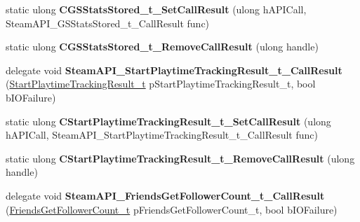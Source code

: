 \begin{DoxyCompactItemize}
static ulong {\bfseries C\+G\+S\+Stats\+Stored\+\_\+t\+\_\+\+Set\+Call\+Result} (ulong h\+A\+P\+I\+Call, Steam\+A\+P\+I\+\_\+\+G\+S\+Stats\+Stored\+\_\+t\+\_\+\+Call\+Result func)
\item 
\mbox{\label{class_valve_1_1_interop_1_1_native_entrypoints_a03a7f11078e5bb086f56d3f08d6b27b3}} 
static ulong {\bfseries C\+G\+S\+Stats\+Stored\+\_\+t\+\_\+\+Remove\+Call\+Result} (ulong handle)
\item 
\mbox{\label{class_valve_1_1_interop_1_1_native_entrypoints_a3dc12766ed22d61e6757cd411f133a44}} 
delegate void {\bfseries Steam\+A\+P\+I\+\_\+\+Start\+Playtime\+Tracking\+Result\+\_\+t\+\_\+\+Call\+Result} (\hyperlink{struct_valve_1_1_steamworks_1_1_start_playtime_tracking_result__t}{Start\+Playtime\+Tracking\+Result\+\_\+t} p\+Start\+Playtime\+Tracking\+Result\+\_\+t, bool b\+I\+O\+Failure)
\item 
\mbox{\label{class_valve_1_1_interop_1_1_native_entrypoints_a19cb50eb57c782f2ad1c85c0666c869b}} 
static ulong {\bfseries C\+Start\+Playtime\+Tracking\+Result\+\_\+t\+\_\+\+Set\+Call\+Result} (ulong h\+A\+P\+I\+Call, Steam\+A\+P\+I\+\_\+\+Start\+Playtime\+Tracking\+Result\+\_\+t\+\_\+\+Call\+Result func)
\item 
\mbox{\label{class_valve_1_1_interop_1_1_native_entrypoints_a192d34c245c77304337e9cbb4312c348}} 
static ulong {\bfseries C\+Start\+Playtime\+Tracking\+Result\+\_\+t\+\_\+\+Remove\+Call\+Result} (ulong handle)
\item 
\mbox{\label{class_valve_1_1_interop_1_1_native_entrypoints_af31551301967d5ad1e00e24cec610d79}} 
delegate void {\bfseries Steam\+A\+P\+I\+\_\+\+Friends\+Get\+Follower\+Count\+\_\+t\+\_\+\+Call\+Result} (\hyperlink{struct_valve_1_1_steamworks_1_1_friends_get_follower_count__t}{Friends\+Get\+Follower\+Count\+\_\+t} p\+Friends\+Get\+Follower\+Count\+\_\+t, bool b\+I\+O\+Failure)
\item 
\mbox{\label{class_valve_1_1_interop_1_1_native_entrypoints_ad5a6e2b88f0e0bcf296bb33809d8fc02}} 

\end{DoxyCompactItemize}
